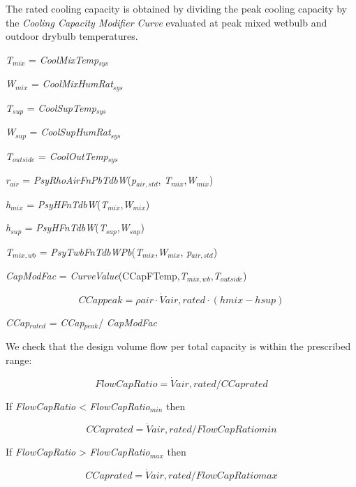 The rated cooling capacity is obtained by dividing the peak cooling capacity by the \emph{Cooling Capacity Modifier Curve} evaluated at peak mixed wetbulb and outdoor drybulb temperatures.

\emph{T\(_{mix}\)} = \emph{CoolMixTemp\(_{sys}\)}

\emph{W\(_{mix}\)} = \emph{CoolMixHumRat\(_{sys}\)}

\emph{T\(_{sup}\)} = \emph{CoolSupTemp\(_{sys}\)}

\emph{W\(_{sup}\)} = \emph{CoolSupHumRat\(_{sys}\)}

\emph{T\(_{outside}\)} = \emph{CoolOutTemp\(_{sys}\)}

\emph{r\(_{air}\)} = \emph{PsyRhoAirFnPbTdbW}(\emph{p\(_{air,std}\)}, \emph{T\(_{mix}\)},\emph{W\(_{mix}\)})

\emph{h\(_{mix}\)} = \emph{PsyHFnTdbW}(\emph{T\(_{mix}\)},\emph{W\(_{mix}\)})

\emph{h\(_{sup}\)} = \emph{PsyHFnTdbW}(\emph{T\(_{sup}\)},\emph{W\(_{sup}\)})

\emph{T\(_{mix,wb}\)} = \emph{PsyTwbFnTdbWPb}(\emph{T\(_{mix}\)},\emph{W\(_{mix}\)}, \emph{p\(_{air,std}\)})

\emph{CapModFac} = \emph{CurveValue}(CCapFTemp,\emph{T\(_{mix,wb}\)},\emph{T\(_{outside}\)})

\begin{equation}
CCappeak = \rho air\cdot \dot Vair,rated\cdot (hmix - hsup)
\end{equation}

\emph{CCap\(_{rated}\)} = \emph{CCap\(_{peak}\)}/ \emph{CapModFac}

We check that the design volume flow per total capacity is within the prescribed range:

\begin{equation}
FlowCapRatio = \dot Vair,rated/CCaprated
\end{equation}

If \emph{FlowCapRatio} \textless{} \emph{FlowCapRatio\(_{min}\)} then

\begin{equation}
CCaprated = \dot Vair,rated/FlowCapRatiomin
\end{equation}

If \emph{FlowCapRatio} \textgreater{} \emph{FlowCapRatio\(_{max}\)} then

\begin{equation}
CCaprated = \dot Vair,rated/FlowCapRatiomax
\end{equation}

